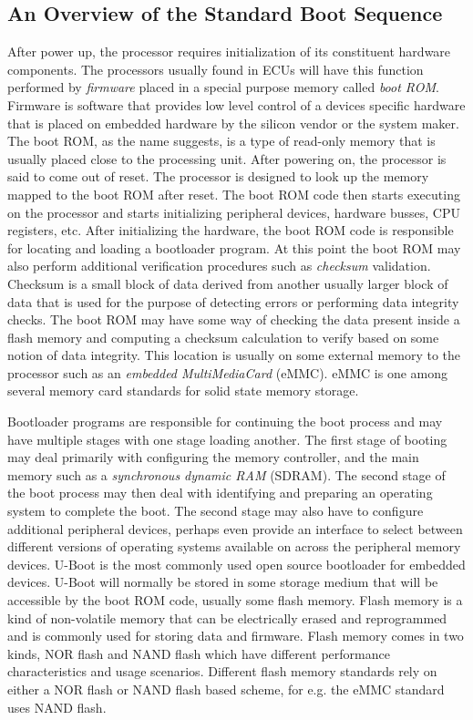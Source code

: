 \subsection{An Overview of the Standard Boot Sequence}

After power up, the processor requires initialization of its constituent hardware components. The processors usually found in ECUs will have this function performed by \textit{firmware} placed in a special purpose memory called \textit{boot ROM}. Firmware is software that provides low level control of a devices specific hardware that is placed on embedded hardware by the silicon vendor or the system maker. The boot ROM, as the name suggests, is a type of read-only memory that is usually placed close to the processing unit. After powering on, the processor is said to come out of reset. The processor is designed to look up the memory mapped to the boot ROM after reset. The boot ROM code then starts executing on the processor and starts initializing peripheral devices, hardware busses, CPU registers, etc. After initializing the hardware, the boot ROM code is responsible for locating and loading a bootloader program. At this point the boot ROM may also perform additional verification procedures such as \textit{checksum} validation. Checksum is a small block of data derived from another usually larger block of data that is used for the purpose of detecting errors or performing data integrity checks. The boot ROM may have some way of checking the data present inside a flash memory and computing a checksum calculation to verify based on some notion of data integrity. This location is usually on some external memory to the processor such as an \textit{embedded MultiMediaCard} (eMMC). eMMC is one among several memory card standards for solid state memory storage.

Bootloader programs are responsible for continuing the boot process and may have multiple stages with one stage loading another. The first stage of booting may deal primarily with configuring the memory controller, and the main memory such as a \textit{synchronous dynamic RAM} (SDRAM). The second stage of the boot process may then deal with identifying and preparing an operating system to complete the boot. The second stage may also have to configure additional peripheral devices, perhaps even provide an interface to select between different versions of operating systems available on across the peripheral memory devices. U-Boot is the most commonly used open source bootloader for embedded devices. U-Boot will normally be stored in some storage medium that will be accessible by the boot ROM code, usually some flash memory. Flash memory is a kind of non-volatile memory that can be electrically erased and reprogrammed and is commonly used for storing data and firmware. Flash memory comes in two kinds, NOR flash and NAND flash which have different performance characteristics and usage scenarios. Different flash memory standards rely on either a NOR flash or NAND flash based scheme, for e.g. the eMMC standard uses NAND flash.

